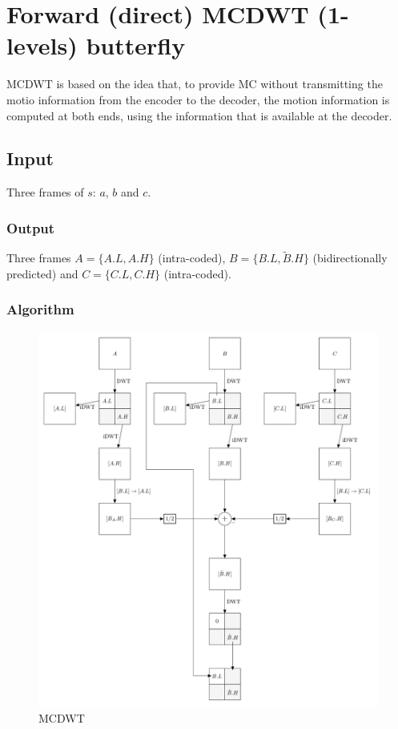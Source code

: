 \section{Forward (direct) MCDWT (1-levels) butterfly}
MCDWT is based on the idea that, to provide MC without transmitting the
motio information from the encoder to the decoder, the motion
information is computed at both ends, using the information that is
available at the decoder.

\subsection{Input}
Three frames of $s$: $a$, $b$ and $c$.

\subsubsection{Output}
Three frames $A=\{A.L, A.H\}$ (intra-coded),
$B=\{B.L, \tilde{B}.H\}$ (bidirectionally predicted) and
$C=\{C.L, C.H\}$ (intra-coded).

\subsubsection{Algorithm}
\begin{figure}
\centering
\includegraphics{forward.png}
\caption{MCDWT}
\end{figure}


